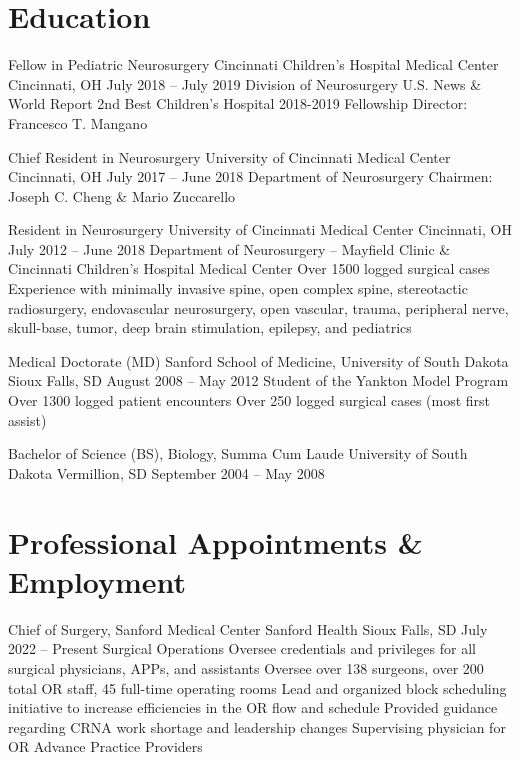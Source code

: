 \documentclass[11pt, a4paper, sans]{moderncv}
\begin{document}
\section{Education}

\cventry%
  {Fellow in Pediatric Neurosurgery}%
  {Cincinnati Children's Hospital Medical Center}%
  {Cincinnati, OH}%
  {July 2018 -- July 2019}%
  {Division of Neurosurgery \textbullet{} U.S. News \& World Report 2nd Best Children's Hospital 2018-2019 \textbullet{} Fellowship Director: Francesco T. Mangano}

\cventry%
  {Chief Resident in Neurosurgery}%
  {University of Cincinnati Medical Center}%
  {Cincinnati, OH}%
  {July 2017 -- June 2018}%
  {Department of Neurosurgery \textbullet{} Chairmen: Joseph C. Cheng \& Mario Zuccarello}

\cventry%
  {Resident in Neurosurgery}%
  {University of Cincinnati Medical Center}%
  {Cincinnati, OH}%
  {July 2012 -- June 2018}%
  {Department of Neurosurgery -- Mayfield Clinic \& Cincinnati Children's Hospital Medical Center \textbullet{} Over 1500 logged surgical cases \textbullet{} Experience with minimally invasive spine, open complex spine, stereotactic radiosurgery, endovascular neurosurgery, open vascular, trauma, peripheral nerve, skull-base, tumor, deep brain stimulation, epilepsy, and pediatrics}

\cventry%
  {Medical Doctorate (MD)}%
  {Sanford School of Medicine, University of South Dakota}%
  {Sioux Falls, SD}%
  {August 2008 -- May 2012}%
  {Student of the Yankton Model Program \textbullet{} Over 1300 logged patient encounters \textbullet{} Over 250 logged surgical cases (most first assist)}

\cventry%
  {Bachelor of Science (BS), Biology, Summa Cum Laude}%
  {University of South Dakota}%
  {Vermillion, SD}%
  {September 2004 -- May 2008}%
  {}

\section{Professional Appointments \& Employment}

\cventry%
  {Chief of Surgery, Sanford Medical Center}%
  {Sanford Health}%
  {Sioux Falls, SD}%
  {July 2022 -- Present}%
  {Surgical Operations \textbullet{} Oversee credentials and privileges for all surgical physicians, APPs, and assistants \textbullet{} Oversee over 138 surgeons, over 200 total OR staff, 45 full-time operating rooms \textbullet{} Lead and organized block scheduling initiative to increase efficiencies in the OR flow and schedule \textbullet{} Provided guidance regarding CRNA work shortage and leadership changes \textbullet{} Supervising physician for OR Advance Practice Providers}
\end{document}
